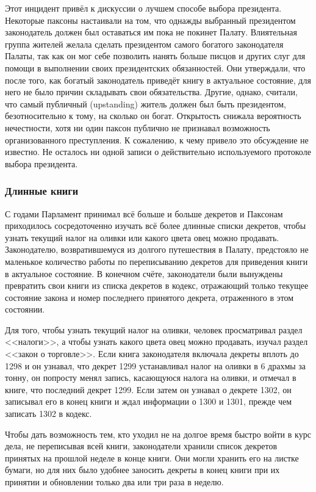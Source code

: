 \documentclass[12pt, a4paper]{article} %
\begin{document}
Этот инцидент привёл к дискуссии о лучшем способе выбора президента. Некоторые паксоны настаивали на том, что однажды выбранный президентом законодатель должен был оставаться им пока не покинет Палату. Влиятельная группа жителей желала сделать президентом самого богатого законодателя Палаты, так как он мог себе позволить нанять больше писцов и других слуг для помощи в выполнении своих президентских обязанностей. Они утверждали, что после того, как богатый законодатель приведёт книгу в актуальное состояние, для него не было причин складывать свои обязательства. Другие, однако, считали, что самый публичный (upstanding) житель должен был быть президентом, безотносительно к тому, на сколько он богат. Открытость снижала вероятность нечестности, хотя ни один паксон публично не признавал возможность организованного преступления. К сожалению, к чему привело это обсуждение не известно. Не осталось ни одной записи о действительно используемого протоколе выбора президента.

\subsubsection{Длинные книги}

С годами Парламент принимал всё больше и больше декретов и Паксонам приходилось сосредоточенно изучать всё более длинные списки декретов, чтобы узнать текущий налог на оливки или какого цвета овец можно продавать. Законодателю, возвратившемуся из долгого путешествия в Палату, предстояло не маленькое количество работы по переписыванию декретов для приведения книги в актуальное состояние. В конечном счёте, законодатели были вынуждены превратить свои книги из списка декретов в кодекс, отражающий только текущее состояние закона и номер последнего принятого декрета, отраженного в этом состоянии.

Для того, чтобы узнать текущий налог на оливки, человек просматривал раздел <<налоги>>, а чтобы узнать какого цвета овец можно продавать, изучал раздел <<закон о торговле>>. Если книга законодателя включала декреты вплоть до 1298 и он узнавал, что декрет 1299 устанавливал налог на оливки в 6 драхмы за тонну, он попросту менял запись, касающуюся налога на оливки, и отмечал в книге, что последний декрет 1299. Если затем он узнавал о декрете 1302, он записывал его в конец книги и ждал информации о 1300 и 1301, прежде чем записать 1302 в кодекс.

Чтобы дать возможность тем, кто уходил не на долгое время быстро войти в курс дела, не переписывая всей книги, законодатели хранили список декретов принятых на прошлой неделе в конце книги. Они могли хранить его на листке бумаги, но для них было удобнее заносить декреты в конец книги при их принятии и обновлении только два или три раза в неделю.
\end{document}

